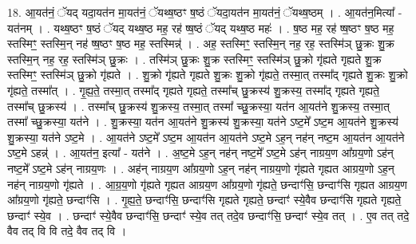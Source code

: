 \documentclass[17pt]{extarticle}
\begin{document}
18. आ॒यत॑नं॒ ॅयद् यदा॒यत॑न मा॒यत॑नं॒ ॅयथ्ष॒ष्ठꣳ ष॒ष्ठं ॅयदा॒यत॑न मा॒यत॑नं॒ ॅयथ्ष॒ष्ठम् । . आ॒यत॑न॒मित्या᳚ - यत॑नम् । . यथ्ष॒ष्ठꣳ ष॒ष्ठं ॅयद् यथ्ष॒ष्ठ मह॒ रह॑ ष्ष॒ष्ठं ॅयद् यथ्ष॒ष्ठ महः॑ । . ष॒ष्ठ मह॒ रह॑ ष्ष॒ष्ठꣳ ष॒ष्ठ मह॒ स्तस्मिꣳ॒॒ स्तस्मि॒न् नह॑ ष्ष॒ष्ठꣳ ष॒ष्ठ मह॒ स्तस्मिन्न्॑ । . अह॒ स्तस्मिꣳ॒॒ स्तस्मि॒न् नह॒ रह॒ स्तस्मि॑ञ् छु॒क्रः शु॒क्र स्तस्मि॒न् नह॒ रह॒ स्तस्मि॑ञ् छु॒क्रः । . तस्मि॑ञ् छु॒क्रः शु॒क्र स्तस्मिꣳ॒॒ स्तस्मि॑ञ् छु॒क्रो गृ॑ह्यते गृह्यते शु॒क्र स्तस्मिꣳ॒॒
स्तस्मि॑ञ् छु॒क्रो गृ॑ह्यते । . शु॒क्रो गृ॑ह्यते गृह्यते शु॒क्रः शु॒क्रो गृ॑ह्यते॒ तस्मा॒त् तस्मा᳚द् गृह्यते शु॒क्रः शु॒क्रो गृ॑ह्यते॒ तस्मा᳚त् । . गृ॒ह्य॒ते॒ तस्मा॒त् तस्मा᳚द् गृह्यते गृह्यते॒ तस्मा᳚च् छु॒क्रस्य॑ शु॒क्रस्य॒ तस्मा᳚द् गृह्यते गृह्यते॒ तस्मा᳚च् छु॒क्रस्य॑ । . तस्मा᳚च् छु॒क्रस्य॑ शु॒क्रस्य॒ तस्मा॒त् तस्मा᳚ च्छु॒क्रस्या॒ यत॑न आ॒यत॑ने शु॒क्रस्य॒ तस्मा॒त् तस्मा᳚ च्छु॒क्रस्या॒ यत॑ने । . शु॒क्रस्या॒ यत॑न आ॒यत॑ने शु॒क्रस्य॑ शु॒क्रस्या॒ यत॑ने ऽष्ट॒मे᳚ ऽष्ट॒म आ॒यत॑ने शु॒क्रस्य॑ शु॒क्रस्या॒ यत॑ने ऽष्ट॒मे । . आ॒यत॑ने ऽष्ट॒मे᳚ ऽष्ट॒म आ॒यत॑न आ॒यत॑ने ऽष्ट॒मे ऽह॒न् नह॑न् नष्ट॒म आ॒यत॑न आ॒यत॑ने ऽष्ट॒मे ऽहन्न्॑ । . आ॒यत॑न॒ इत्या᳚ - यत॑ने । . अ॒ष्ट॒मे ऽह॒न् नह॑न् नष्ट॒मे᳚ ऽष्ट॒मे ऽह॑न् नाग्रय॒ण आ᳚ग्रय॒णो ऽह॑न् नष्ट॒मे᳚ ऽष्ट॒मे ऽह॑न् नाग्रय॒णः । . अह॑न् नाग्रय॒ण आ᳚ग्रय॒णो ऽह॒न् नह॑न् नाग्रय॒णो गृ॑ह्यते गृह्यत आग्रय॒णो ऽह॒न् नह॑न् नाग्रय॒णो गृ॑ह्यते । . आ॒ग्र॒य॒णो गृ॑ह्यते गृह्यत आग्रय॒ण आ᳚ग्रय॒णो गृ॑ह्यते॒ छन्दाꣳ॑सि॒ छन्दाꣳ॑सि गृह्यत आग्रय॒ण आ᳚ग्रय॒णो गृ॑ह्यते॒ छन्दाꣳ॑सि । . गृ॒ह्य॒ते॒ छन्दाꣳ॑सि॒ छन्दाꣳ॑सि गृह्यते गृह्यते॒ छन्दाꣳ॑ स्ये॒वैव छन्दाꣳ॑सि गृह्यते गृह्यते॒ छन्दाꣳ॑ स्ये॒व । . छन्दाꣳ॑ स्ये॒वैव छन्दाꣳ॑सि॒ छन्दाꣳ॑ स्ये॒व तत् तदे॒व छन्दाꣳ॑सि॒ छन्दाꣳ॑ स्ये॒व तत् । . ए॒व तत् तदे॒ वैव तद् वि वि तदे॒ वैव तद् वि । \newline
\end{document}
